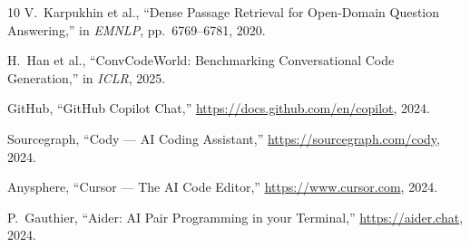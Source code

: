 \documentclass[conference]{IEEEtran}
\begin{document}
\begin{thebibliography}{10}
V.~Karpukhin et al., ``Dense Passage Retrieval for Open-Domain Question Answering,''
in \textit{EMNLP}, pp.~6769--6781, 2020.

H.~Han et al., ``ConvCodeWorld: Benchmarking Conversational Code Generation,''
in \textit{ICLR}, 2025.

GitHub, ``GitHub Copilot Chat,'' \url{https://docs.github.com/en/copilot}, 2024.

Sourcegraph, ``Cody --- AI Coding Assistant,'' \url{https://sourcegraph.com/cody}, 2024.

Anysphere, ``Cursor --- The AI Code Editor,'' \url{https://www.cursor.com}, 2024.

P.~Gauthier, ``Aider: AI Pair Programming in your Terminal,'' \url{https://aider.chat}, 2024.

\end{thebibliography}
\end{document}

